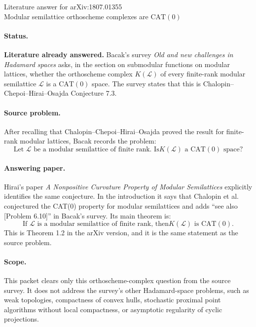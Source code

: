 \documentclass[11pt]{article}
\newcommand{\cat}{\mathrm{CAT}(0)}
\begin{document}
\begin{center}
{\Large Literature answer for arXiv:1807.01355}\\[0.4em]
{\large Modular semilattice orthoscheme complexes are \(\cat\)}
\end{center}

\paragraph{Status.}
\textbf{Literature already answered.}  Bacak's survey \emph{Old and new
challenges in Hadamard spaces} asks, in the section on submodular functions on
modular lattices, whether the orthoscheme complex \(K(\mathcal L)\) of every
finite-rank modular semilattice \(\mathcal L\) is a \(\cat\) space.  The survey
states that this is Chalopin--Chepoi--Hirai--Osajda Conjecture 7.3.

\paragraph{Source problem.}
After recalling that Chalopin--Chepoi--Hirai--Osajda proved the result for
finite-rank modular lattices, Bacak records the problem:
\[
\text{Let \(\mathcal L\) be a modular semilattice of finite rank. Is
\(K(\mathcal L)\) a \(\cat\) space?}
\]

\paragraph{Answering paper.}
Hirai's paper \emph{A Nonpositive Curvature Property of Modular Semilattices}
explicitly identifies the same conjecture.  In the introduction it says that
Chalopin et al. conjectured the CAT(0) property for modular semilattices and
adds ``see also [Problem 6.10]'' in Bacak's survey.  Its main theorem is:
\[
\text{If \(\mathcal L\) is a modular semilattice of finite rank, then
\(K(\mathcal L)\) is \(\cat\).}
\]
This is Theorem 1.2 in the arXiv version, and it is the same statement as the
source problem.

\paragraph{Scope.}
This packet clears only this orthoscheme-complex question from the source
survey.  It does not address the survey's other Hadamard-space problems, such
as weak topologies, compactness of convex hulls, stochastic proximal point
algorithms without local compactness, or asymptotic regularity of cyclic
projections.
\end{document}
